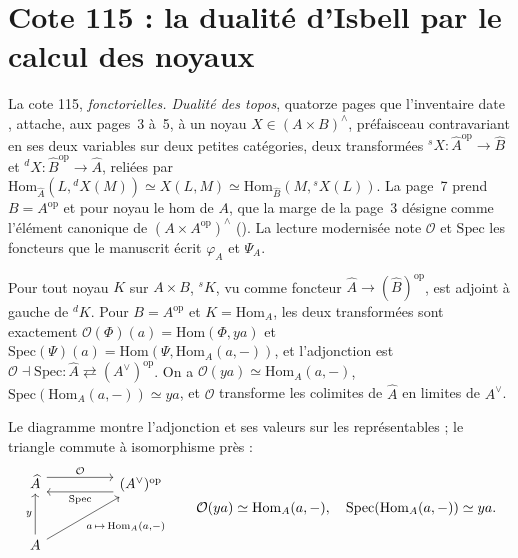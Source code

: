 \section[Cote 115 : la dualité d'Isbell par le calcul des noyaux]{Cote 115 : la dualité d'Isbell par le calcul des noyaux\protect{}}\label{sec:115}

La cote 115, \emph{ fonctorielles. Dualité des topos}, quatorze pages que l'inventaire date \q{[à partir de 1982]}, attache, aux pages~3 à~5, à un noyau $X \in (A \times B)^\wedge$, préfaisceau contravariant en ses deux variables sur deux petites catégories, deux transformées ${}^sX : \widehat A^{\mathrm{op}} \to \widehat B$ et ${}^dX : \widehat B^{\mathrm{op}} \to \widehat A$, reliées par $\mathrm{Hom}_{\widehat A}(L, {}^dX(M)) \simeq X(L, M) \simeq \mathrm{Hom}_{\widehat B}(M, {}^sX(L))$. La page~7 prend $B = A^{\mathrm{op}}$ et pour noyau le hom de $A$, que la marge de la page~3 désigne comme l'élément canonique de $(A \times A^{\mathrm{op}})^\wedge$ (). La lecture modernisée note $\mathcal O$ et $\mathrm{Spec}$ les foncteurs que le manuscrit écrit $\varphi_A$ et $\Psi_A$.

\begin{encadre}
\begin{theoreme}
Pour tout noyau $K$ sur $A \times B$, ${}^sK$, vu comme foncteur $\widehat A \to (\widehat B)^{\mathrm{op}}$, est adjoint à gauche de ${}^dK$. Pour $B = A^{\mathrm{op}}$ et $K = \mathrm{Hom}_A$, les deux transformées sont exactement $\mathcal O(\Phi)(a) = \mathrm{Hom}(\Phi, y a)$ et $\mathrm{Spec}(\Psi)(a) = \mathrm{Hom}(\Psi, \mathrm{Hom}_A(a, -))$, et l'adjonction est $\mathcal O \dashv \mathrm{Spec} : \widehat A \rightleftarrows (A^\vee)^{\mathrm{op}}$. On a $\mathcal O(y a) \simeq \mathrm{Hom}_A(a, -)$, $\mathrm{Spec}(\mathrm{Hom}_A(a, -)) \simeq y a$, et $\mathcal O$ transforme les colimites de $\widehat A$ en limites de $A^\vee$.
\end{theoreme}
\end{encadre}

Le diagramme montre l'adjonction et ses valeurs sur les représentables ; le triangle commute à isomorphisme près :
\[
\begin{tikzcd}[column sep=huge, row sep=large]
\widehat A \arrow[r, shift left=1.2ex, "\mathcal O"] & (A^\vee)^{\mathrm{op}} \arrow[l, shift left=1.2ex, "\mathrm{Spec}"] \\
A \arrow[u, "y"] \arrow[ur, "{a \,\mapsto\, \mathrm{Hom}_A(a, -)}"'] &
\end{tikzcd}
\qquad \mathcal O(ya) \simeq \mathrm{Hom}_A(a, -), \quad \mathrm{Spec}(\mathrm{Hom}_A(a, -)) \simeq ya.
\]

